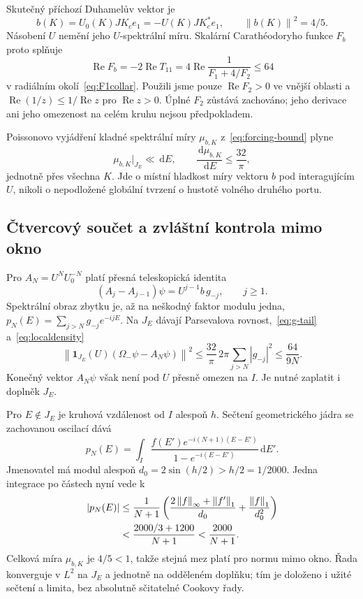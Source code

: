 \documentclass[11pt,a4paper]{article}
\newcommand{\norm}[1]{\left\lVert#1\right\rVert}
\newcommand{\ind}{\mathbf1}
\newcommand{\dd}{\,\mathrm d}
\newcommand{\Rea}{\operatorname{Re}}
\theoremstyle{remark}\newtheorem{remark}[theorem]{Poznámka}
\numberwithin{equation}{section}
\begin{document}
Skutečný příchozí Duhamelův vektor je
\[
b(K)=U_0(K)JK_ce_1=-U(K)JK_c^*e_1,\qquad \norm{b(K)}^2=4/5.
\]
Násobení \(U\) nemění jeho \(U\)-spektrální míru. Skalární Carathéodoryho funkce \(F_b\) proto splňuje
\begin{equation}
\Rea F_b=-2\Rea T_{11}
=4\Rea\frac1{F_1+4/F_2}\le64
\label{eq:forcing-bound}
\end{equation}
v radiálním okolí~\eqref{eq:F1collar}. Použili jsme pouze
\(\Rea F_2>0\) ve vnější oblasti a
\(\Rea(1/z)\le1/\Rea z\) pro \(\Rea z>0\).
Úplné \(F_2\) zůstává zachováno; jeho derivace ani jeho omezenost na celém kruhu nejsou předpokladem.

Poissonovo vyjádření kladné spektrální míry \(\mu_{b,K}\) z~\eqref{eq:forcing-bound} plyne
\begin{equation}
\mu_{b,K}|_{J_E}\ll\dd E,\qquad
\frac{\dd\mu_{b,K}}{\dd E}\le\frac{32}{\pi},
\label{eq:localdensity}
\end{equation}
jednotně přes všechna \(K\). Jde o místní hladkost míry vektoru \(b\) pod interagujícím \(U\), nikoli o nepodložené globální tvrzení o hustotě volného druhého portu.

\subsection{Čtvercový součet a zvláštní kontrola mimo okno}

Pro \(A_N=U^NU_0^{-N}\) platí přesná teleskopická identita
\[
(A_j-A_{j-1})\psi=U^{j-1}b\,g_{-j},\qquad j\ge1.
\]
Spektrální obraz zbytku je, až na neškodný faktor modulu jedna,
\(p_N(E)=\sum_{j>N}g_{-j}e^{-ijE}\).
Na \(J_E\) dávají Parsevalova rovnost,~\eqref{eq:g-tail} a~\eqref{eq:localdensity}
\begin{equation}
\norm{\ind_{J_E}(U)(\Omega_-\psi-A_N\psi)}^2
\le\frac{32}{\pi}\,2\pi\sum_{j>N}|g_{-j}|^2
\le\frac{64}{9N}.
\label{eq:incoming-local}
\end{equation}
Konečný vektor \(A_N\psi\) však není pod \(U\) přesně omezen na \(I\). Je nutné zaplatit i doplněk \(J_E\).

Pro \(E\notin J_E\) je kruhová vzdálenost od \(I\) alespoň \(h\). Sečtení geometrického jádra se zachovanou oscilací dává
\[
p_N(E)=\int_I
\frac{f(E')e^{-i(N+1)(E-E')}}{1-e^{-i(E-E')}}\dd E'.
\]
Jmenovatel má modul alespoň
\(d_0=2\sin(h/2)>h/2=1/2000\).
Jedna integrace po částech nyní vede k
\begin{align}
|p_N(E)|&\le\frac1{N+1}
\left(\frac{2\norm f_\infty+\norm{f'}_1}{d_0}
+\frac{\norm f_1}{d_0^2}\right)\notag\\
&<\frac{2000/3+1200}{N+1}<\frac{2000}{N+1}.
\label{eq:offarc}
\end{align}
Celková míra \(\mu_{b,K}\) je \(4/5<1\), takže stejná mez platí pro normu mimo okno. Řada konverguje v \(L^2\) na \(J_E\) a jednotně na odděleném doplňku; tím je doloženo i užité sečtení a limita, bez absolutně sčitatelné Cookovy řady.
\end{document}
